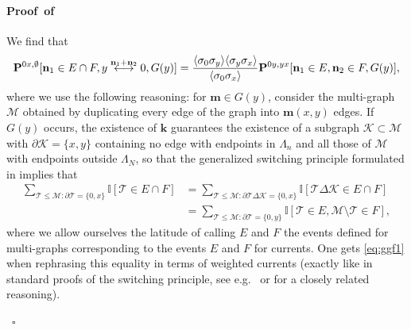 \documentclass[a4paper,oneside,11pt]{article}
\numberwithin{equation}{section}
\numberwithin{equation}{section}
\numberwithin{equation}{section}
\newenvironment{proof}[1][\relax]%
  {\paragraph{Proof\ifx#1\relax\else~of #1\fi}}%
  {~\hfill$\square$\par\bigskip}
\newcommand{\calK}{\mathcal{K}}
\newcommand{\calM}{\mathcal{M}}
\newcommand{\calT}{\mathcal{T}}
\newcommand{\n}{\mathbf{n}}
\newcommand{\m}{\mathbf m}
\begin{document}
\begin{proof}
We find that
\begin{align}\label{eq:ggf1}{\bf P}^{0x,\emptyset}[\n_1\in E\cap F,y\stackrel{\n_1+\n_2}\longleftrightarrow 0,G(y)]=\frac{\langle\sigma_0\sigma_y\rangle\langle\sigma_y\sigma_x\rangle}{\langle\sigma_0\sigma_x\rangle}{\bf P}^{0y,yx}[\n_1\in E,\n_2\in F,G(y)],\end{align}
where we use the following reasoning:
for  $\m\in G(y)$, consider the multi-graph $\calM$ obtained by duplicating every edge of the graph into $\m(x,y)$ edges. If $G(y)$ occurs, the existence of $\mathbf k$ guarantees the existence of a subgraph $\calK\subset\calM$ with $\partial\calK=\{x,y\}$ containing no edge with endpoints in $\Lambda_n$ and all those of $\calM$ with endpoints outside $\Lambda_N$, so that the generalized switching principle formulated in \cite[Lemma~2.1]{AizDumTasWar18} implies that 
\begin{align}\sum_{\calT\le\calM:\partial\calT=\{0,x\}}\mathbb I[\calT\in E\cap F]&=\sum_{\calT\le\calM:\partial\calT\Delta\calK=\{0,x\}}\mathbb I[\calT\Delta\calK\in E\cap F]\nonumber\\
&=\sum_{\calT\le\calM:\partial\calT=\{0,y\}}\mathbb I[\calT\in E,\calM\setminus\calT\in F],\label{eq:swit}\end{align}
where we allow ourselves the latitude of calling $E$ and $F$ the events defined for multi-graphs corresponding to the events $E$ and $F$ for currents. One gets \eqref{eq:ggf1} when rephrasing this equality in terms of weighted currents (exactly like in standard proofs of the switching principle, see e.g.~\cite{Aiz82} or \cite{AizDumTasWar18} for a closely related reasoning).
 

\end{proof}
\end{document}
